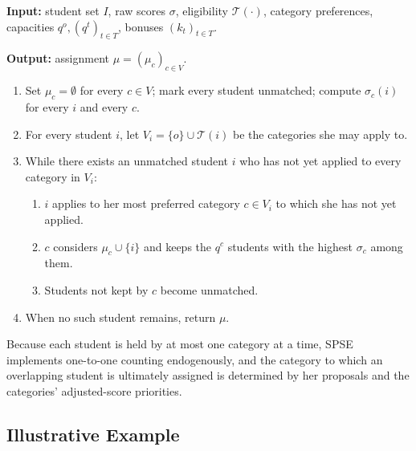 \documentclass[10pt]{article}
\newcommand{\T}{\mathcal{T}}
\newcommand{\1}{\mathbf{1}}
\begin{document}
\begin{algorithm}[H]
\caption{Student-Proposing Score-Elevated Mechanism (SPSE)}
\label{alg:spse}
\small
\textbf{Input:} student set $I$, raw scores $\sigma$, eligibility $\T(\cdot)$, category preferences, capacities $q^o,(q^t)_{t\in T}$, bonuses $(k_t)_{t\in T}$.

\textbf{Output:} assignment $\mu=(\mu_c)_{c\in V}$.
\begin{enumerate}
\item Set $\mu_c=\emptyset$ for every $c\in V$; mark every student unmatched; compute $\sigma_c(i)$ for every $i$ and every $c$.
\item For every student $i$, let $V_i=\{o\}\cup\T(i)$ be the categories she may apply to.
\item While there exists an unmatched student $i$ who has not yet applied to every category in $V_i$:
\begin{enumerate}
\item $i$ applies to her most preferred category $c\in V_i$ to which she has not yet applied.
\item $c$ considers $\mu_c\cup\{i\}$ and keeps the $q^c$ students with the highest $\sigma_c$ among them.
\item Students not kept by $c$ become unmatched.
\end{enumerate}
\item When no such student remains, return $\mu$.
\end{enumerate}
\end{algorithm}

Because each student is held by at most one category at a time, SPSE implements one-to-one counting endogenously, and the category to which an overlapping student is ultimately assigned is determined by her proposals and the categories' adjusted-score priorities.

\subsection{Illustrative Example}
\end{document}
